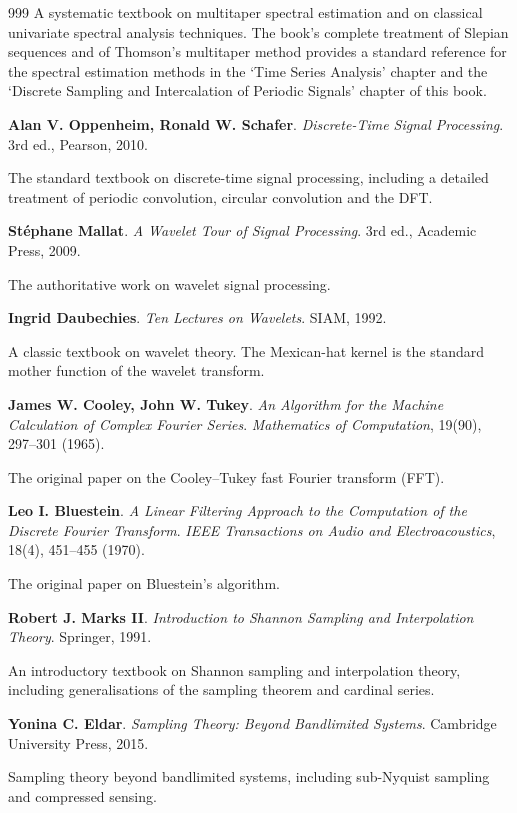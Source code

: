 \begin{thebibliography}{999}
A systematic textbook on multitaper spectral estimation and on classical univariate spectral analysis techniques. The book's complete treatment of Slepian sequences and of Thomson's multitaper method provides a standard reference for the spectral estimation methods in the `Time Series Analysis' chapter and the `Discrete Sampling and Intercalation of Periodic Signals' chapter of this book.

 \textbf{Alan V. Oppenheim, Ronald W. Schafer}. \textit{Discrete-Time Signal Processing}. 3rd ed., Pearson, 2010.

The standard textbook on discrete-time signal processing, including a detailed treatment of periodic convolution, circular convolution and the DFT.

 \textbf{St\'ephane Mallat}. \textit{A Wavelet Tour of Signal Processing}. 3rd ed., Academic Press, 2009.

The authoritative work on wavelet signal processing.

 \textbf{Ingrid Daubechies}. \textit{Ten Lectures on Wavelets}. SIAM, 1992.

A classic textbook on wavelet theory. The Mexican-hat kernel is the standard mother function of the wavelet transform.

 \textbf{James W. Cooley, John W. Tukey}. \textit{An Algorithm for the Machine Calculation of Complex Fourier Series}. \textit{Mathematics of Computation}, 19(90), 297--301 (1965).

The original paper on the Cooley--Tukey fast Fourier transform (FFT).

 \textbf{Leo I. Bluestein}. \textit{A Linear Filtering Approach to the Computation of the Discrete Fourier Transform}. \textit{IEEE Transactions on Audio and Electroacoustics}, 18(4), 451--455 (1970).

The original paper on Bluestein's algorithm.

 \textbf{Robert J. Marks II}. \textit{Introduction to Shannon Sampling and Interpolation Theory}. Springer, 1991.

An introductory textbook on Shannon sampling and interpolation theory, including generalisations of the sampling theorem and cardinal series.

 \textbf{Yonina C. Eldar}. \textit{Sampling Theory: Beyond Bandlimited Systems}. Cambridge University Press, 2015.

Sampling theory beyond bandlimited systems, including sub-Nyquist sampling and compressed sensing.


\end{thebibliography}
